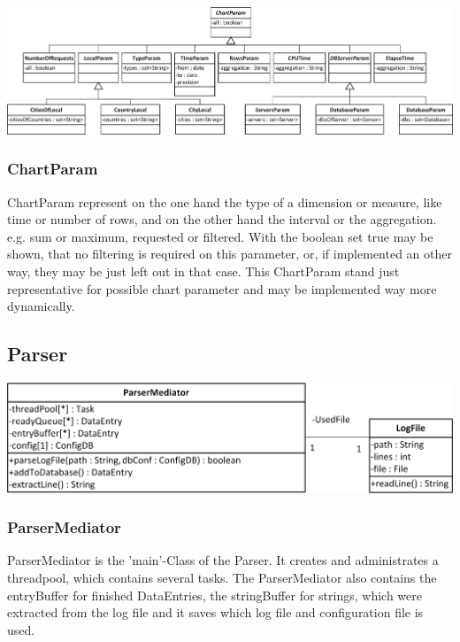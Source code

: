 \begin{center}
\includegraphics[width=1\linewidth]{Pictures/Parts/ChartPara.png}
\end{center}  

\subsubsection*{ChartParam}  
ChartParam represent on the one hand the type of a dimension or measure, like time or number of rows, and
on the other hand the interval or the aggregation. e.g. sum or maximum, requested or filtered. %
With the boolean set true may be shown, that no filtering is required on this parameter, or, if implemented
an other way, they may be just left out in that case. 
This ChartParam stand just representative for possible chart parameter and may be implemented way more dynamically.



\newpage
\subsection{Parser}

\begin{center}
\includegraphics{Pictures/Parts/ParsMedi.png}
\end{center}  

\subsubsection*{ParserMediator}
ParserMediator is the 'main'-Class of the Parser. It creates and administrates a threadpool,
 which contains several tasks.
The ParserMediator also contains the entryBuffer for finished DataEntries, the stringBuffer for strings,
which were extracted from the log file and it saves which log file and configuration file is used.

